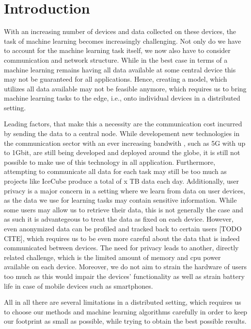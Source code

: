 \chapter{Introduction}
With an increasing number of devices and data collected on these devices, the task of machine learning becomes increasingly challenging.
Not only do we have to account for the machine learning task itself, we now also have to consider communication and network structure.
While in the best case in terms of a machine learning remains having all data available at some central device this may not be guaranteed for all applications.
Hence, creating a model, which utilizes all data available may not be feasible anymore, which requires us to bring machine learning tasks to the edge, i.e., onto individual devices in a distributed setting.

Leading factors, that make this a necessity are the communication cost incurred by sending the data to a central node.
While developement new technologies in the communication sector with an ever increasing bandwith , such as 5G with up to 1Gbit, are still being developed and deployed around the globe, it is still not possible to make use of this technology in all application. 
Furthermore, attempting to communicate all data for each task may still be too much as projects like IceCube produce a total of x TB data each day.
Additionally, user privacy is a major concern in a setting where we learn from data on user devices, as the data we use for learning tasks may contain sensitive information.
While some users may allow us to retrieve their data, this is not generally the case and as such it is advantegeous to treat the data as fixed on each device.   
However, even anonymized data can be profiled and tracked back to certain users [TODO CITE], which requires us to be even more careful about the data that is indeed communicated between devices.
The need for privacy leads to another, directly related challenge, which is the limited amount of memory and cpu power available on each device.
Moreover, we do not aim to strain the hardware of users too much as this would impair the devices' functionality as well as strain battery life in case of mobile devices such as smartphones.

All in all there are several limitations in a distributed setting, which requires us to choose our methods and machine learning algorithms carefully in order to keep our footprint as small as possible, while trying to obtain the best possible results.

